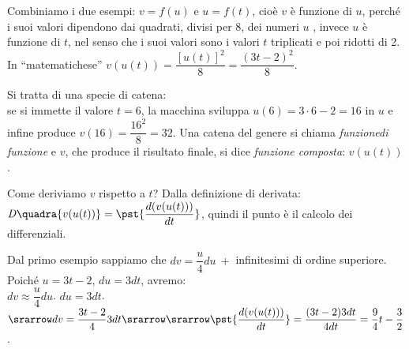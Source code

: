 Combiniamo i due esempi: $v=f(u)$ e $u=f(t)$, cioè $v$ è funzione di $u$, 
perché i suoi valori dipendono dai quadrati, divisi per $8$, dei numeri $u$ ,
invece $u$ è funzione di $t$, nel senso che i suoi valori sono i valori $t$ 
triplicati e poi ridotti di 2. In ``matematichese'' 
$v(u(t))=\dfrac{[u(t)]^2}{8}=\dfrac{(3t-2)^2}{8}$.


\begin{inaccessibleblock}
 \begin{center}
 \begin{minipage}[]{.48\textwidth}
  \boxfcomposta
 \end{minipage} 
 \hfill
 \begin{minipage}[]{.48\textwidth}
Si tratta di una specie di catena:\\
se si immette il valore $t=6$, la macchina sviluppa $u(6)=3\cdot 6-2=16$ in $u$
e infine produce $v(16)=\dfrac{16^2}{8}=32$. Una catena del genere si chiama 
\emph{funzionedi funzione} e $v$, che produce il risultato finale, si dice
\emph{funzione composta}: $v(u(t))$.\\
 \end{minipage}
 \end{center}
\end{inaccessibleblock}
\label{}

Come deriviamo  $v$ rispetto a $t$? Dalla definizione di derivata: 
$\mathit{D}\quadra{v(u(t))}=\pst{\dfrac{d(v(u(t)))}{dt}}$, 
quindi il punto è il calcolo dei differenziali.
\begin{inaccessibleblock}
 \begin{center}
 \begin{minipage}[]{.48\textwidth}
  \diffcomposta
 \end{minipage} 
  \hfill
 \begin{minipage}[]{.48\textwidth}
Dal primo esempio sappiamo che $dv=\dfrac{u}{4}du\ +$ infinitesimi di ordine 
superiore.
Poiché $u=3t-2$, $du=3dt$, avremo:\\
$dv\approx \dfrac{u}{4}du$. \hspace{1cm} $du=3dt$. $\srarrow dv=\dfrac{3t-2}{4}3dt \srarrow\\ 
\srarrow \pst{\dfrac{d(v(u(t)))}{dt}}=\dfrac{(3t-2)3dt}{4dt}=\dfrac{9}{4}t-\dfrac{3}{2}$.\\
 \end{minipage}
 \end{center}
\end{inaccessibleblock}
\label{}

